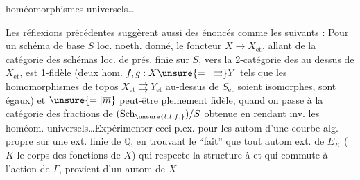 homéomorphismes universels\ldots

Les réflexions précédentes suggèrent aussi des énoncés comme les suivants : Pour un schéma de base $S$ loc. noeth. donné, le foncteur $X\longrightarrow X_{\mathrm{et}}$, allant de la catégorie  des schémas loc. de prés. finie sur $S$, vers la 2-catégorie des  au dessus de $X_{\mathrm{et}}$, est  1-fidèle (deux hom. $f,g:X\unsure{=|\rightrightarrows}Y$ tels que les homomorphismes de topos $X_{\mathrm{et}}\rightrightarrows Y_{\mathrm{et}}$ au-dessus de $S_{\mathrm{et}}$ soient isomorphes, sont égaux) et $\unsure{=|\overline m}$ peut-être \uline{pleinement} \uline{fidèle}, quand on passe à la catégorie des fractions de $(\mathrm{Sch}_{\unsure{l.t.f.}})/S$ obtenue en rendant inv. les homéom. universels\ldots Expérimenter  ceci p.ex. pour les autom d'une courbe alg. propre sur une ext. finie de $\mathbb{Q}$, en trouvant le ``fait'' que tout autom ext. de $E_K$ ($K$ le corps des fonctions de $X$) qui respecte la structure à  et qui commute à l'action de $\Gamma$, provient d'un autom de $X$
